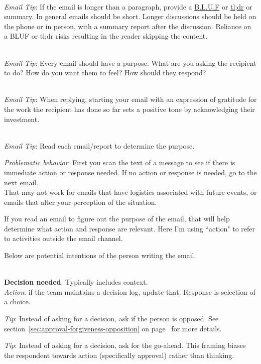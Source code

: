 \ \\
\textit{Email Tip}: If the email is longer than a paragraph, provide a \href{https://en.wikipedia.org/wiki/BLUF_(communication)}{B.L.U.F} or \href{https://en.wikipedia.org/wiki/Wikipedia:Too_long;_didn\%27t_read}{tl;dr} or summary. In general emails should be short. Longer discussions should be held on the phone or in person, with a summary report after the discussion. Reliance on a BLUF or tl;dr risks resulting in the reader skipping the content. 

\ \\
\textit{Email Tip}: Every email should have a purpose. What are you asking the recipient to do? How do you want them to feel? How should they respond?

\ \\
\textit{Email Tip}: When replying, starting your email with an expression of gratitude for the work the recipient has done so far sets a positive tone by acknowledging their investment.

\ \\
\textit{Email Tip}: Read each email/report to determine the purpose.

\textit{Problematic behavior}: First you scan the text of a message to see if there is immediate action or response needed. If no action or response is needed, go to the next email. \\
That may not work for emails that have logistics associated with future events, or emails that alter your perception of the situation.


If you read an email to figure out the purpose of the email, that will help determine what action and response are relevant. Here I'm using ``action" to refer to activities outside the email channel. 


Below are potential intentions of the person writing the email. 

\ \\
\textbf{Decision needed}. Typically includes context. \\
\textit{Action}: if the team maintains a decision log, update that.
Response is selection of a choice.

\textit{Tip}: Instead of asking for a decision, ask if the person is opposed. See 
section~\ref{sec:approval-forgiveness-opposition} on 
page~\pageref{sec:approval-forgiveness-opposition} 
for more details.

\textit{Tip}: Instead of asking for a decision, ask for the go-ahead. This framing biases the respondent towards action (specifically approval) rather than thinking. 

